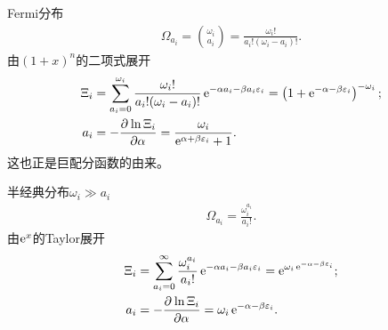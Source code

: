 Fermi分布
\begin{align}
	\Omega_{a_i}=\binom{\omega_i}{a_i}=\frac{\omega_i!}{a_i!(\omega_i-a_i)!}.
\end{align}
由$(1+x)^n$的二项式展开
\begin{align}
	\Xi_i&=\sum_{a_i=0}^{\omega_i}\frac{\omega_i!}{a_i!(\omega_i-a_i)!}\mathop{}\!\mathrm{e}^{-\alpha a_i-\beta a_i\varepsilon_i}=\left(1+\mathop{}\!\mathrm{e}^{-\alpha-\beta\varepsilon_i}\right)^{-\omega_i};\\
	a_i&=-\frac{\partial^{{}}\ln\Xi_i}{\partial{\alpha}^{{}}}=\frac{\omega_i}{\mathop{}\!\mathrm{e}^{\alpha+\beta\varepsilon_i}+1}.
\end{align}
这也正是巨配分函数的由来。

半经典分布$\omega_i\gg a_i$ 
\begin{align}
	\Omega_{a_i}=\frac{\omega_i^{a_i}}{a_i!}.
\end{align}
由$\mathop{}\!\mathrm{e}^{x}$的Taylor展开
\begin{align}
	\Xi_i&=\sum_{a_i=0}^\infty\frac{\omega_i^{a_i}}{a_i!}\mathop{}\!\mathrm{e}^{-\alpha a_i-\beta a_i\varepsilon_i}=\mathop{}\!\mathrm{e}^{\omega_i\mathop{}\!\mathrm{e}^{-\alpha-\beta\varepsilon_i}};\\
	a_i&=-\frac{\partial^{{}}\ln\Xi_i}{\partial{\alpha}^{{}}}=\omega_i\mathop{}\!\mathrm{e}^{-\alpha-\beta\varepsilon_i}.
\end{align}